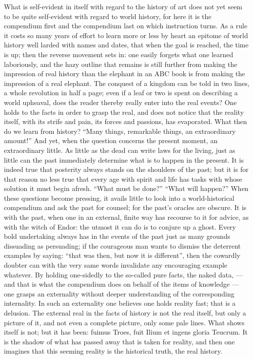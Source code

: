 \documentclass[12pt,a4paper,openany]{book}
\newcommand{\opage}[1]{\marginnote{\footnotesize\textit{[#1]}}}
\begin{document}
\setcounter{footnote}{0}%
\opage{426}What is self-evident in itself with regard
to the history of art does not yet seem to be quite
self-evident with regard to world history, for here it
is the compendium first and the compendium last on which instruction
turns. As a rule it costs so many
years of effort to learn more or less by heart an epitome of
world history well larded with names and dates,
that when the goal is reached, the time is up; then the
reverse movement sets in: one easily forgets
what one learned laboriously, and the hazy outline
that remains is still further from making the
impression of real history than the elephant in an ABC book
is from making the impression of a real elephant. The
conquest of a kingdom can be told in two lines, a whole revolution
in half a page; even if a leaf
or two is spent on describing a world upheaval, does
the reader thereby really enter into the real
events? One holds to the facts
in order to grasp the real, and does not notice that the reality
itself, with its strife and pain, its forces
and passions, has evaporated. What then do we learn from
history? ``Many things, remarkable things, an extraordinary
amount!'' And yet, when the question concerns the
present moment, an extraordinary little. As little as
the dead can write laws for the living, just as little
can the past immediately determine what
is to happen in the present. It is indeed true that
posterity always stands on the shoulders of the past; but it
is for that reason no less true that every age
with spirit and life has tasks with whose solution it must
begin afresh. ``What must be done?'' ``What will
\setcounter{footnote}{0}%
\opage{427}happen?'' When these questions become pressing,
it avails little to look into a world-historical
compendium and ask the past for counsel; for the past's
oracles are obscure. It is with the past, when one
in an external, finite way has recourse to it for advice, as
with the witch of Endor: the utmost it can do
is to conjure up a ghost. Every bold undertaking
always has in the events of the past just as many grounds
dissuading as persuading; if the courageous man wants to dismiss
the deterrent examples by saying: ``that was
then, but now it is different'', then the cowardly
doubter can with the very same words invalidate any
encouraging example whatever. By holding one-sidedly
to the so-called pure facts, the naked data,
--- and that is what the compendium does on behalf of the items of knowledge ---
one grasps an externality without deeper understanding of the
corresponding internality. In such an externality one believes
one holds reality fast; that is a delusion.
The external real in the facts of history is
not the real itself, but only a picture of it, and not
even a complete picture, only some pale lines.
What shows itself is not; but it has been:
fuimus Troes, fuit Ilium et ingens gloria Teucrum. It
is the shadow of what has passed away that is taken for reality,
and then one imagines that this seeming reality is
the historical truth, the real history.
\end{document}
